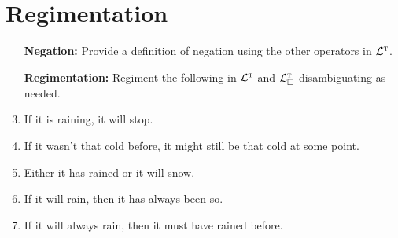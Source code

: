 \documentclass[a4paper, 11pt]{article}                  %
\begin{document}

\section{Regimentation}

\begin{enumerate}

  \item[\bf Negation:] Provide a definition of negation using the other operators in $\mathcal{L}^{\textsc{t}}$.

	\item[\bf Regimentation:] Regiment the following in $\mathcal{L}^{\textsc{t}}$ and $\mathcal{L}^{\textsc{t}}_\square$ disambiguating as needed.

    \item If it is raining, it will stop.

    \item If it wasn't that cold before, it might still be that cold at some point.

    \item Either it has rained or it will snow.

    \item If it will rain, then it has always been so.

    \item If it will always rain, then it must have rained before.


\end{enumerate}
\end{document}
